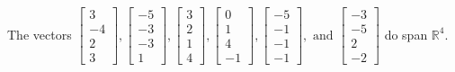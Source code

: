 \begin{exercise}
\begin{exerciseStatement}
  \end{exerciseStatement}
  \begin{exerciseAnswer}
   The vectors \(\left[\begin{array}{r}
3 \\
-4 \\
2 \\
3
\end{array}\right] , \left[\begin{array}{r}
-5 \\
-3 \\
-3 \\
1
\end{array}\right] , \left[\begin{array}{r}
3 \\
2 \\
1 \\
4
\end{array}\right] , \left[\begin{array}{r}
0 \\
1 \\
4 \\
-1
\end{array}\right] , \left[\begin{array}{r}
-5 \\
-1 \\
-1 \\
-1
\end{array}\right] , \text{ and } \left[\begin{array}{r}
-3 \\
-5 \\
2 \\
-2
\end{array}\right]\) 
  	 do  
	span \(\mathbb{R}^4\).
  


  \end{exerciseAnswer}
\end{exercise}